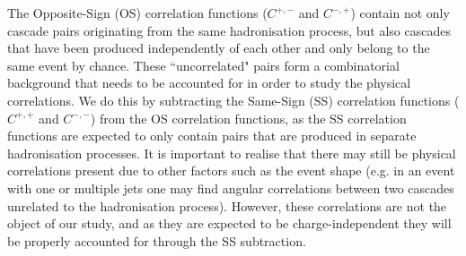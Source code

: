 The Opposite-Sign (OS) correlation functions ($C^{+,-}$ and $C^{-,+}$) contain not only cascade pairs originating from the same hadronisation process,  but also cascades that have been produced independently of each other and only belong to the same event by chance. These ``uncorrelated" pairs form a combinatorial background that needs to be accounted for in order to study the physical correlations. We do this by subtracting the Same-Sign (SS) correlation functions ($C^{+,+}$ and $C^{-,-}$) from the OS correlation functions, as the SS correlation functions are expected to only contain pairs that are produced in separate hadronisation processes. It is important to realise that there may still be physical correlations present due to other factors such as the event shape (e.g. in an event with one or multiple jets one may find angular correlations between two cascades unrelated to the hadronisation process). However, these correlations are not the object of our study, and as they are expected to be charge-independent they will be properly accounted for through the SS subtraction. 


